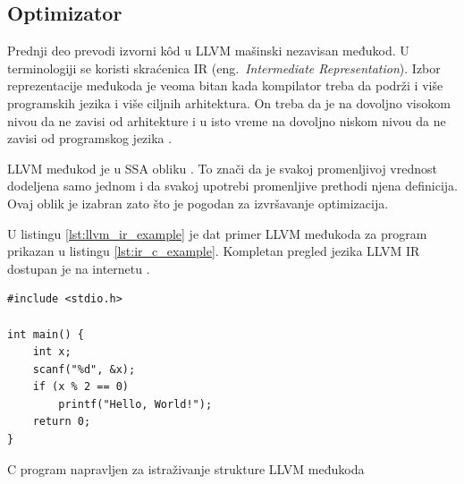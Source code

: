 \documentclass[12pt,oneside]{memoir}
\begin{document}
\subsection{Optimizator}


Prednji deo prevodi izvorni k\^od u LLVM mašinski nezavisan međukod.
U terminologiji se koristi skraćenica IR (eng.~{\em Intermediate Representation}).
Izbor reprezentacije međukoda je veoma bitan kada kompilator treba da podrži i više programskih jezika i više ciljnih arhitektura.
On treba da je na dovoljno visokom nivou da ne zavisi od arhitekture i u isto vreme na dovoljno niskom nivou da ne zavisi od programskog jezika \cite{sarda2015llvm_essentials}.

LLVM međukod je u SSA obliku \cite{rastello2022ssa}.
To znači da je svakoj promenljivoj vrednost dodeljena samo jednom i da svakoj upotrebi promenljive prethodi njena definicija.
Ovaj oblik je izabran zato što je pogodan za izvršavanje optimizacija.

U listingu \ref{lst:llvm_ir_example} je dat primer LLVM međukoda za program prikazan u listingu \ref{lst:ir_c_example}.
Kompletan pregled jezika LLVM IR dostupan je na internetu \cite{llvmlangref}.

\begin{listing}[!ht]
\begin{verbatim}
#include <stdio.h>

int main() {
	int x;
	scanf("%d", &x);
	if (x % 2 == 0)
		printf("Hello, World!");
	return 0;
}
\end{verbatim}
\caption{C program napravljen za istraživanje strukture LLVM međukoda}
\label{lst:ir_c_example}
\end{listing}
\end{document}
